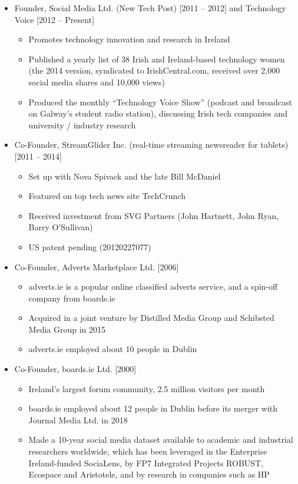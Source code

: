 \documentclass[10pt,a4paper]{res} %
\begin{document}
\begin{resume}
\begin{itemize}
\begin{itemize}
\end{itemize}
\item Founder, Social Media Ltd. (New Tech Post) [2011 -- 2012] and Technology Voice [2012 -- Present]
\begin{itemize} \itemsep -2pt
\item Promotes technology innovation and research in Ireland
\item Published a yearly list of 38 Irish and Ireland-based technology women (the 2014 version, syndicated to IrishCentral.com, received over 2,000 social media shares and 10,000 views)
\item Produced the monthly ``Technology Voice Show'' (podcast and broadcast on Galway's student radio station), discussing Irish tech companies and university / industry research
\end{itemize}
\item Co-Founder, StreamGlider Inc. (real-time streaming newsreader for tablets) [2011 -- 2014]
\begin{itemize} \itemsep -2pt
\item Set up with Nova Spivack and the late Bill McDaniel
\item Featured on top tech news site TechCrunch
\item Received investment from SVG Partners (John Hartnett, John Ryan, Barry O'Sullivan)
\item US patent pending (20120227077)
\end{itemize}
\item Co-Founder, Adverts Marketplace Ltd. [2006]
\begin{itemize} \itemsep -2pt
\item adverts.ie is a popular online classified adverts service, and a spin-off company from boards.ie
\item Acquired in a joint venture by Distilled Media Group and Schibsted Media Group in 2015
\item adverts.ie employed about 10 people in Dublin
\end{itemize}
\item Co-Founder, boards.ie Ltd. [2000]
\begin{itemize} \itemsep -2pt
\item Ireland's largest forum community, 2.5 million visitors per month
\item boards.ie employed about 12 people in Dublin before its merger with Journal Media Ltd. in 2018
\item Made a 10-year social media dataset available to academic and industrial researchers worldwide, which has been leveraged in the Enterprise Ireland-funded SociaLens, by FP7 Integrated Projects ROBUST, Ecospace and Aristotele, and by research in companies such as HP
\end{itemize}
\end{itemize}


\end{resume}
\end{document}
